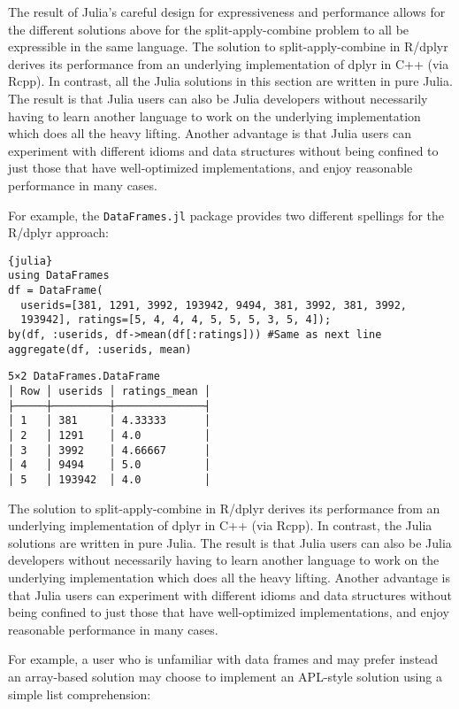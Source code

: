 \documentclass[11pt]{asaproc}
\begin{document}
The result of Julia's careful design for expressiveness and performance allows
for the different solutions above for the split-apply-combine problem to all be
expressible in the same language.
The solution to split-apply-combine in R/dplyr derives its performance from an
underlying implementation of dplyr in C++ (via Rcpp). In contrast, all the
Julia solutions in this section are written in pure Julia. The result is that
Julia users can also be Julia developers without necessarily having to learn
another language to work on the underlying implementation which does all the
heavy lifting. Another advantage is that Julia users can experiment with
different idioms and data structures without being confined to just those that
have well-optimized implementations, and enjoy reasonable performance in many
cases.

For example, the \lstinline|DataFrames.jl| package provides two different
spellings for the R/dplyr approach:

\begin{lstlisting}{julia}
using DataFrames
df = DataFrame(
  userids=[381, 1291, 3992, 193942, 9494, 381, 3992, 381, 3992,
  193942], ratings=[5, 4, 4, 4, 5, 5, 5, 3, 5, 4]);
by(df, :userids, df->mean(df[:ratings])) #Same as next line
aggregate(df, :userids, mean)
\end{lstlisting}
\begin{verbatim}
5×2 DataFrames.DataFrame
│ Row │ userids │ ratings_mean │
├─────┼─────────┼──────────────┤
│ 1   │ 381     │ 4.33333      │
│ 2   │ 1291    │ 4.0          │
│ 3   │ 3992    │ 4.66667      │
│ 4   │ 9494    │ 5.0          │
│ 5   │ 193942  │ 4.0          │
\end{verbatim}

The solution to split-apply-combine in R/dplyr derives its performance from an
underlying implementation of dplyr in C++ (via Rcpp). In contrast, the Julia
solutions are written in pure Julia. The result is that Julia users can also be
Julia developers without necessarily having to learn another language to work
on the underlying implementation which does all the heavy lifting. Another
advantage is that Julia users can experiment with different idioms and data
structures without being confined to just those that have well-optimized
implementations, and enjoy reasonable performance in many cases.

For example, a user who is unfamiliar with data frames and may prefer instead
an array-based solution may choose to implement an APL-style solution using a
simple list comprehension:
\end{document}
